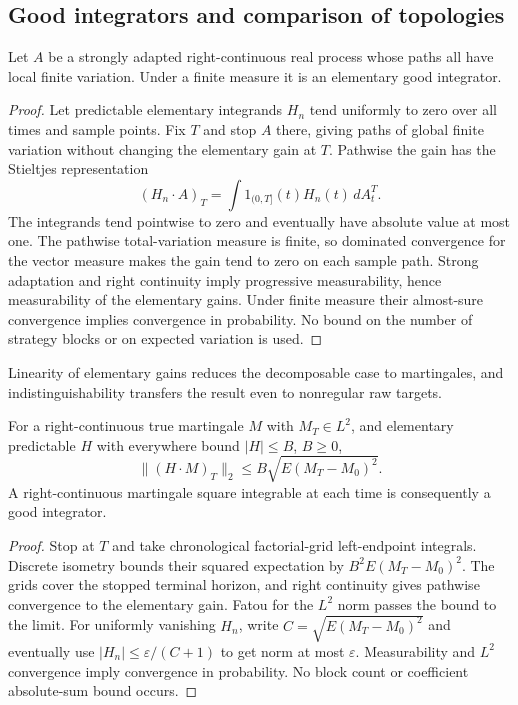 \subsection{Good integrators and comparison of topologies}
\label{sec:emery-completeness}
\begin{lemma}
Let $A$ be a strongly adapted right-continuous real process whose paths
all have local finite variation. Under a finite measure it is an
elementary good integrator.
\end{lemma}
\begin{proof}
Let predictable elementary integrands $H_n$ tend uniformly to zero over
all times and sample points. Fix $T$ and stop $A$ there, giving paths of
global finite variation without changing the elementary gain at $T$.
Pathwise the gain has the Stieltjes representation
\[
 (H_n\cdot A)_T=\int1_{(0,T]}(t)H_n(t)\,dA^T_t.
\]
The integrands tend pointwise to zero and eventually have absolute value
at most one. The pathwise total-variation measure is finite, so dominated
convergence for the vector measure makes the gain tend to zero on each
sample path. Strong adaptation and right continuity imply progressive
measurability, hence measurability of the elementary gains. Under finite
measure their almost-sure convergence implies convergence in probability.
No bound on the number of strategy blocks or on expected variation is used.
\end{proof}
Linearity of elementary gains reduces the decomposable case to martingales,
and indistinguishability transfers the result even to nonregular raw targets.
\begin{lemma}
For a right-continuous true martingale $M$ with $M_T\in L^2$, and elementary
predictable $H$ with everywhere bound $|H|\leq B$, $B\geq0$,
\[
 \|(H\cdot M)_T\|_2\leq B\sqrt{E(M_T-M_0)^2}.
\]
A right-continuous martingale square integrable at each time is consequently
a good integrator.
\end{lemma}
\begin{proof}
Stop at $T$ and take chronological factorial-grid left-endpoint integrals.
Discrete isometry bounds their squared expectation by $B^2E(M_T-M_0)^2$.
The grids cover the stopped terminal horizon, and right continuity gives
pathwise convergence to the elementary gain. Fatou for the $L^2$ norm passes
the bound to the limit. For uniformly vanishing $H_n$, write
$C=\sqrt{E(M_T-M_0)^2}$ and eventually use
$|H_n|\leq\varepsilon/(C+1)$ to get norm at most $\varepsilon$.
Measurability and $L^2$ convergence imply convergence in probability.
No block count or coefficient absolute-sum bound occurs.
\end{proof}
